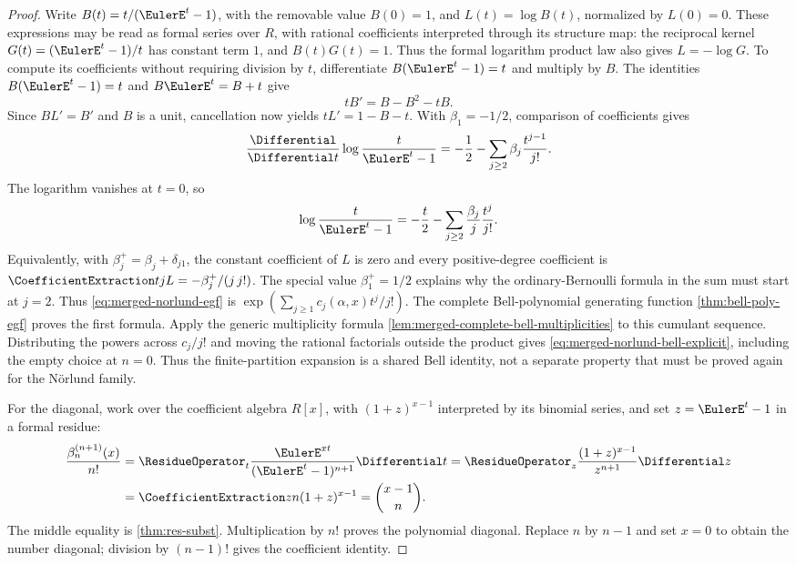 \documentclass[11pt,a4paper,oneside,openany]{book}
\theoremstyle{definition}
\theoremstyle{remark}
\begin{document}
\begin{proof}
Write $B(t)=t/(\EulerE^t-1)$, with the removable value $B(0)=1$, and
$L(t)=\log B(t)$, normalized by $L(0)=0$.
These expressions may be read as formal series over $R$, with rational
coefficients interpreted through its structure map: the reciprocal kernel
$G(t)=(\EulerE^t-1)/t$ has constant term $1$, and $B(t)G(t)=1$.
Thus the formal logarithm product law also gives $L=-\log G$.
To compute its coefficients without requiring division by $t$,
differentiate $B(\EulerE^t-1)=t$ and multiply by $B$.  The identities
$B(\EulerE^t-1)=t$ and $B\EulerE^t=B+t$ give
\[
 tB'=B-B^2-tB.
\]
Since $BL'=B'$ and $B$ is a unit, cancellation now yields
$tL'=1-B-t$.  With $\beta_1=-1/2$, comparison of coefficients gives
\[
 \frac{\Differential}{\Differential t}\log\frac{t}{\EulerE^t-1}
 =-\frac12-\sum_{j\geq2}\beta_j\frac{t^{j-1}}{j!}.
\]
The logarithm vanishes at $t=0$, so
\begin{equation}
 \log\frac{t}{\EulerE^t-1}
 =-\frac t2-\sum_{j\geq2}\frac{\beta_j}{j}\frac{t^j}{j!}.       \label{eq:merged-log-bernoulli-kernel}
\end{equation}
Equivalently, with $\beta_j^+=\beta_j+\delta_{j1}$, the constant
coefficient of $L$ is zero and every positive-degree coefficient is
$\CoefficientExtraction tj L=-\beta_j^+/(j\,j!)$.
The special value $\beta_1^+=1/2$ explains why the ordinary-Bernoulli
formula in the sum must start at $j=2$.
Thus \eqref{eq:merged-norlund-egf} is
$\exp(\sum_{j\geq1}c_j(\alpha,x)t^j/j!)$.
The complete Bell-polynomial generating function
\cref{thm:bell-poly-egf} proves the first formula.
Apply the generic multiplicity formula
\cref{lem:merged-complete-bell-multiplicities} to this cumulant sequence.
Distributing the powers across $c_j/j!$ and moving the rational
factorials outside the product gives
\cref{eq:merged-norlund-bell-explicit}, including the empty choice at
$n=0$.  Thus the finite-partition expansion is a shared Bell identity,
not a separate property that must be proved again for the N\"orlund family.

For the diagonal, work over the coefficient algebra $R[x]$, with
$(1+z)^{x-1}$ interpreted by its binomial series, and set
$z=\EulerE^t-1$ in a formal residue:
\begin{align*}
 \frac{\beta_n^{(n+1)}(x)}{n!}
 &=\ResidueOperator_t
   \frac{\EulerE^{xt}}{(\EulerE^t-1)^{n+1}}\Differential t
 =\ResidueOperator_z\frac{(1+z)^{x-1}}{z^{n+1}}\Differential z\\
 &=\CoefficientExtraction z n(1+z)^{x-1}=\binom{x-1}{n}.
\end{align*}
The middle equality is \cref{thm:res-subst}.  Multiplication by $n!$ proves
the polynomial diagonal.  Replace $n$ by $n-1$ and set $x=0$ to obtain the
number diagonal; division by $(n-1)!$ gives the coefficient identity.
\end{proof}
\end{document}
